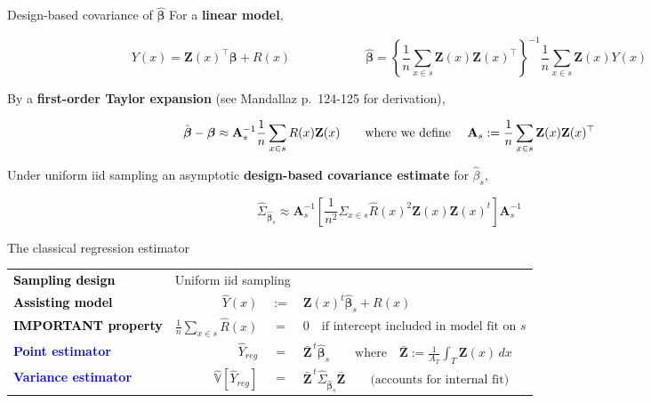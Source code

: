 \documentclass[
  ignorenonframetext,
  aspectratio=169,
]{beamer}
\begin{document}
\begin{frame}{Design-based covariance of \(\hat{\boldsymbol{\beta}}\)}
\label{design-based-covariance-of-hatboldsymbolbeta}
For a \textbf{linear model}, \vspace{-.2em}

\[
Y(x)
=
\mathbf{Z}(x)^\top \boldsymbol{\beta}
+
R(x) \qquad\qquad\qquad
\hat{\boldsymbol{\beta}}
=
\left\{
\frac{1}{n}
\sum_{x \in s}
\mathbf{Z}(x)\mathbf{Z}(x)^\top
\right\}^{-1}
\frac{1}{n}
\sum_{x \in s}
\mathbf{Z}(x)Y(x)
\]

\vspace{0.3em}

By a \textbf{first-order Taylor expansion} (see Mandallaz p.~124-125 for
derivation),

\[
\hat{\boldsymbol{\beta}}
-
\boldsymbol{\beta}
\approx
\mathbf{A}_s^{-1}
\frac{1}{n}
\sum_{x \in s}
R(x)\mathbf{Z}(x) \qquad \text{where we define \quad} \mathbf{A}_s
:=
\frac{1}{n}
\sum_{x \in s}
\mathbf{Z}(x)\mathbf{Z}(x)^\top
\]

\vspace{0.3em}

Under uniform iid sampling an asymptotic
\textbf{design-based covariance estimate} for \(\hat{\beta}_s\),

\[
\hat\Sigma_{\hat{\boldsymbol{\beta}}_s}
\approx
\mathbf{A}_s^{-1}
\left[
\frac{1}{n^2}
\Sigma_{x \in s}
\hat{R}(x)^2
\mathbf{Z}(x)\mathbf{Z}(x)^t
\right]
\mathbf{A}_s^{-1}
\]
\end{frame}

\begin{frame}{The classical regression estimator}
\label{the-classical-regression-estimator}
\begingroup
\renewcommand{\arraystretch}{1.55}
\begin{tabular}{@{}p{} r c l@{}}

\textcolor{black}{\textbf{Sampling design}} &
  \multicolumn{3}{l}{\hspace{.3em} Uniform iid sampling} \\[0em]

\textcolor{black}{\textbf{Assisting model}} &
  $\hat{Y}(x)$ & $:=$ &
  $\displaystyle \mathbf{Z}(x)^t\hat{\boldsymbol{\beta}}_s + R(x)$ \\[1.5em]

\textcolor{black}{\textbf{IMPORTANT property}} &
  $\frac{1}{n}\sum_{x \in s}\hat R(x)$ & $=$ & $0
  \quad
  \text{if intercept included in model fit on }s$
  \\[1.5em]

\textcolor{blue}{\textbf{Point estimator}} &
  $\hat{Y}_{reg}$ & $=$ &
  $\displaystyle
  \bar{\mathbf Z}^{\,t}\hat{\boldsymbol{\beta}}_s \qquad \text{where} \quad \bar{\mathbf Z}:=\frac{1}{A_T}\int_T\mathbf Z(x)\,dx$
  \\[1.5em]

\textcolor{blue}{\textbf{Variance estimator}} &
  $\hat{\mathbb V}[\hat{Y}_{reg}]$ & $=$ &
  $\displaystyle
  \bar{\mathbf Z}^{\,t}
  \hat\Sigma_{\hat{\boldsymbol{\beta}}_s}
  \bar{\mathbf Z} \qquad \text{(accounts for internal fit)}$

\end{tabular}
\endgroup
\end{frame}
\end{document}
